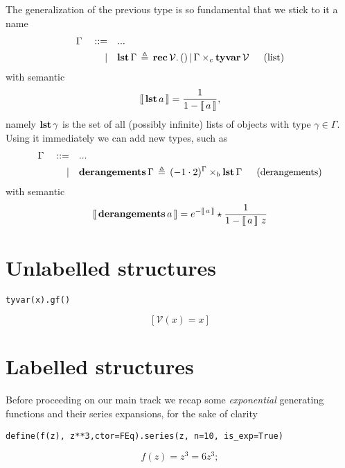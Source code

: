 The generalization of the previous type is so fundamental that we stick to it a name
\begin{displaymath}
\begin{split}
    \Gamma\quad::=\quad&... \\
           |\quad&\lst{\Gamma}\,\triangleq\,\rec{\mathcal{V}}{()\,|\,\Gamma\times_{c}\tyvar{\mathcal{V}}}\indent\text{(list)}
\end{split}
\end{displaymath}
with semantic
\begin{displaymath}
    \left\llbracket\,\textbf{lst}\,a\,\right\rrbracket = \frac{1}{1-\left\llbracket\,a\,\right\rrbracket},
\end{displaymath}
namely $\textbf{lst}\,\gamma$ is the set of all (possibly infinite) lists of
objects with type $\gamma\in\Gamma$. Using it immediately we can add new types, such 
as 
\begin{displaymath}
\begin{split}
    \Gamma\quad::=\quad&... \\
           |\quad&\derangements{\Gamma}\,\triangleq\,(-1\cdot2)^{\Gamma}\times_{b}\lst{\Gamma}\indent\text{(derangements)}
\end{split}
\end{displaymath}
with semantic
\begin{displaymath}
    \left\llbracket\,\textbf{derangements}\,a\,\right\rrbracket = e^{-\left\llbracket\,a\,\right\rrbracket}\star\frac{1}{1-\left\llbracket\,a\,\right\rrbracket\,z}
\end{displaymath}

\section{Unlabelled structures}

\begin{verbatim}
tyvar(x).gf()
\end{verbatim}
\begin{displaymath}
\left [ \mathcal{V}{\left (x \right )} = x\right ]
\end{displaymath}

\section{Labelled structures}

Before proceeding on our main track we recap some \emph{exponential} generating
functions and their series expansions, for the sake of clarity

\begin{verbatim}
define(f(z), z**3,ctor=FEq).series(z, n=10, is_exp=True)
\end{verbatim}
\begin{displaymath}
f{\left (z \right )} = z^{3} = 6 z^{3};
\end{displaymath}

